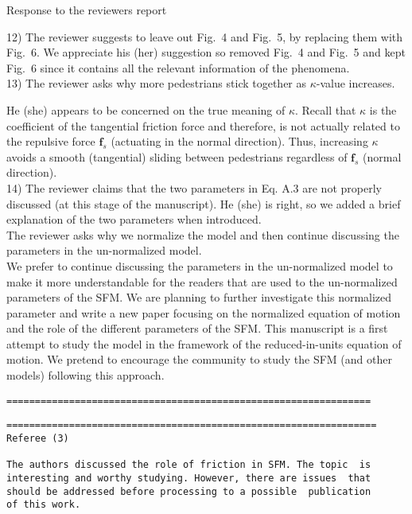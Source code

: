\documentclass[a4paper,12pt]{letter}
\begin{document}
\begin{letter}{Response to the reviewers report}
{12) The reviewer suggests to leave out Fig.~4 and Fig.~5, by replacing them with Fig.~6. 
We appreciate his (her) suggestion so removed Fig.~4 and Fig.~5 and kept Fig.~6 since it
contains all the relevant information of the phenomena. \\

13) The reviewer asks why more pedestrians stick together as $\kappa$-value increases. 

He (she) appears to be concerned on the true meaning of $\kappa$. 
Recall that $\kappa$ is the coefficient of the tangential friction force and therefore,
is not actually related to the repulsive force $\mathbf{f}_s$ (actuating in the normal direction). 
Thus, increasing $\kappa$ avoids a smooth (tangential) sliding between pedestrians
regardless of $\mathbf{f}_s$ (normal direction). \\

14) The reviewer claims that the two parameters in Eq. A.3 are not properly discussed (at this stage of the manuscript).
He (she) is right, so we added a brief explanation of the two parameters when introduced.\\

The reviewer asks why we normalize the model and then continue discussing the parameters in the un-normalized model.\\

We prefer to continue discussing the parameters in the un-normalized model to make it more understandable for the readers that are used to the un-normalized parameters of the SFM. We are planning to further investigate this normalized parameter and write a new paper focusing on the normalized equation of motion and the role of the different parameters of the SFM. This manuscript is a first attempt to study the model in the framework of the reduced-in-units equation of motion. We pretend to encourage the community to study the SFM (and other models) following this approach.


\begin{verbatim}
================================================================
\end{verbatim}

}

\newpage


\begin{verbatim}
=================================================================
Referee (3)

The authors discussed the role of friction in SFM. The topic  is 
interesting and worthy studying. However, there are issues  that 
should be addressed before processing to a possible  publication 
of this work.


\end{verbatim}
\end{letter}
\end{document}
